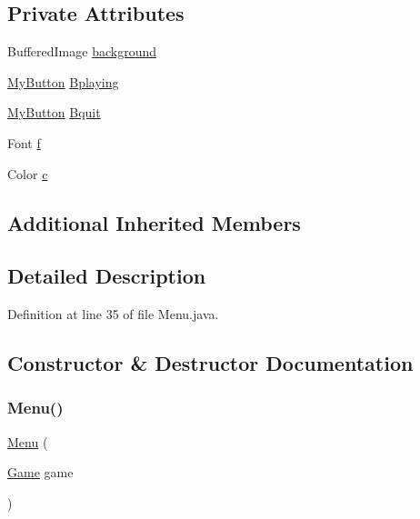 \subsection*{Private Attributes}
\begin{DoxyCompactItemize}
\item 
Buffered\+Image \hyperlink{classscenes_1_1_menu_a714354485419fb2b615f17fcce85657e}{background}
\item 
\hyperlink{classui_1_1_my_button}{My\+Button} \hyperlink{classscenes_1_1_menu_a6ae4732612c0dde2b4c09415d929195c}{Bplaying}
\item 
\hyperlink{classui_1_1_my_button}{My\+Button} \hyperlink{classscenes_1_1_menu_aade8ed8111cde7693a187ea2ad3406b9}{Bquit}
\item 
Font \hyperlink{classscenes_1_1_menu_a3fb562f10e8f7f83cb2ed130eab6d439}{f}
\item 
Color \hyperlink{classscenes_1_1_menu_a02094092ae89aa4b23bff1976bcbf90d}{c}
\end{DoxyCompactItemize}
\subsection*{Additional Inherited Members}


\subsection{Detailed Description}


Definition at line 35 of file Menu.\+java.



\subsection{Constructor \& Destructor Documentation}
\mbox{\label{classscenes_1_1_menu_aa568425829ee847c6c97c418516a3c81}} 
\subsubsection{\texorpdfstring{Menu()}{Menu()}}
{\footnotesize\ttfamily \hyperlink{classscenes_1_1_menu}{Menu} (\begin{DoxyParamCaption}\item[{\hyperlink{classprogetto_1_1_game}{Game}}]{game }\end{DoxyParamCaption})}



